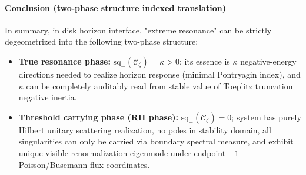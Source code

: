 \paragraph{Conclusion (two-phase structure indexed translation)}
In summary, in disk horizon interface, "extreme resonance" can be strictly degeometrized into the following two-phase structure:
\begin{itemize}
  \item \textbf{True resonance phase:} \(\mathrm{sq}_-(\mathscr{C}_{\zeta})=\kappa>0\); its essence is \(\kappa\) negative-energy directions needed to realize horizon response (minimal Pontryagin index), and \(\kappa\) can be completely auditably read from stable value of Toeplitz truncation negative inertia.
  \item \textbf{Threshold carrying phase (RH phase):} \(\mathrm{sq}_-(\mathscr{C}_{\zeta})=0\); system has purely Hilbert unitary scattering realization, no poles in stability domain, all singularities can only be carried via boundary spectral measure, and exhibit unique visible renormalization eigenmode under endpoint \(-1\) Poisson/Busemann flux coordinates.
\end{itemize}

\endinput
